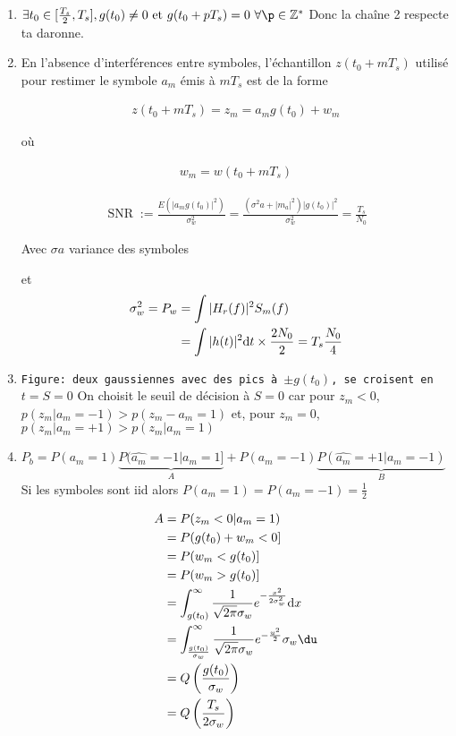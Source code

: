 \documentclass{article}
\begin{document}
\begin{enumerate}
    \item $\exists t_0 \in [\frac{T_s}{2}, T_s], g(t_0) \neq 0 \text{ et } g(t_0 + pT_s) = 0 \ \forall \p\in \Z^\ast$
        Donc la chaîne 2 respecte ta daronne.
    \item En l'absence d'interférences entre symboles, l'échantillon $z(t_0+mT_s)$ utilisé pour restimer le symbole $a_m$ émis à $mT_s$ est de la forme

         \begin{align*}
            z(t_0+mT_s) = z_m  = a_m g(t_0) + w_m
        \end{align*}

        où 

        \begin{align*}
            w_m = w(t_0 + mT_s)
        \end{align*}

        \begin{align*}
            \operatorname{SNR} := \frac{E(|a_mg(t_0)|^2)}{\sigma_w^2} = \frac{(\sigma^2a + |m_a|^2) |g(t_0)|^2}{\sigma_w^2} = \frac{T_s}{N_0}
        \end{align*}

        Avec $\sigma a$ variance des symboles

        et 
\begin{align*}
    \sigma_w^2 = P_w &= \int |H_r(f)|^2 S_m(f)  \\
    &= \int |h(t)|^2 \mathrm{d}t  \times \frac{2N_0}{2} = T_s \frac{N_0}{4}  \\
\end{align*}

\item 
\texttt{Figure: deux gaussiennes avec des pics à $\pm g(t_0)$, se croisent en $t=S=0$}
On choisit le seuil de décision à $S=0$ car pour $z_m < 0$, $p(z_m | a_m = -1) > p(z_m - a_m = 1)$ et, pour $z_m = 0$, $p(z_m | a_m = +1) > p(z_m | a_m = 1)$

\item $P_b = P(a_m = 1) \underbrace{P(\hat{a_m} = -1 | a_m = 1]}_A + P(a_m = -1) \underbrace{P(\hat{a_m} = +1 | a_m = -1)}_B$
    Si les symboles sont iid alors $P(a_m = 1) = P(a_m = -1) = \frac{1}{2}$

    \begin{align*}
        A &= P(z_m < 0 | a_m = 1) \\
          &= P(g(t_0) + w_m < 0 ] \\
          &= P(w_m < g(t_0)]  \\
          &= P(w_m > g(t_0)] \\
          &= \int_{g(t_0)}^{\infty} \frac{1}{\sqrt{2 \pi} \sigma_w} e^{- \frac{x^2}{2 \sigma_w^2}} \dx \\
          &= \int_{\frac{g(t_0)}{\sigma_w}}^{\infty} \frac{1}{\sqrt{2 \pi} \sigma_w} e^{-\frac{u^2}{2}} \sigma_w \du \\
          &= Q\left( \frac{g(t_0)}{\sigma_w} \right)  \\
          &= Q\left( \frac{T_s}{2 \sigma_w} \right)  \\
    \end{align*}


\end{enumerate}
\end{document}
